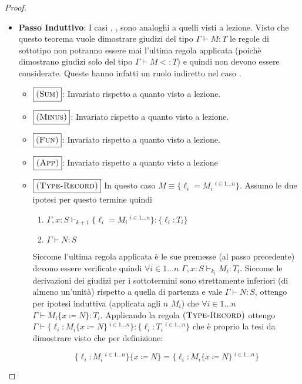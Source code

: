 \begin{proof}
\begin{itemize}
\begin{itemize}
		\item \textbf{Passo Induttivo}:  
		I casi , ,  sono analoghi a quelli visti a lezione. Visto che questo teorema
		vuole dimostrare giudizi del tipo $\Gamma \vdash M : T$ le regole di sottotipo non potranno essere mai l'ultima regola 
		applicata (poich\`e dimostrano giudizi solo del tipo $\Gamma \vdash M <: T$) e quindi non devono essere considerate. Queste hanno infatti un ruolo
		indiretto nel caso .
		\begin{itemize}
			\item $\boxed{\textsc{(Sum)}}$: Invariato rispetto a quanto visto a lezione.
			\item $\boxed{\textsc{(Minus)}}$: Invariato rispetto a quanto visto a lezione.
			\item $\boxed{\textsc{(Fun)}}$: Invariato rispetto a quanto visto a lezione.
			\item $\boxed{\textsc{(App)}}$: Invariato rispetto a quanto visto a lezione
			\item $\boxed{\textsc{(Type-Record)}}$
			In questo caso $M \equiv \{\ell_i = M_i\ ^{i \in 1 \dots n} \}$. Assumo le due ipotesi per questo termine
			quindi 
			\begin{enumerate}
				\item $\Gamma, x : S \vdash_{k+1} \{\ell_i = M_i\ ^{i \in 1 \dots n}\} : \{\ell_i : T_i\}$
				\item $\Gamma \vdash N : S$
			\end{enumerate}
			Siccome l'ultima regola applicata \`e  le sue premesse (al passo precedente) devono essere verificate quindi
			$\forall i \in 1 \dots n$ $ \Gamma, x : S \vdash_{k_i} M_i : T_i$. 
			Siccome le derivazioni dei giudizi per i sottotermini sono strettamente inferiori (di almeno un'unit\`a) rispetto
			a quella di partenza e vale $\Gamma \vdash N : S$, ottengo per ipotesi induttiva (applicata agli $n$ $M_i$) che
			$\forall i \in 1 \dots n$ $\Gamma \vdash M_i \{x \coloneqq N\} : T_i$.
			Applicando la regola $\textsc{(Type-Record)}$ ottengo
			$\Gamma \vdash \{\ell_i : M_i\{x \coloneqq N\}\ ^{i \in 1 \dots n} \} : \{\ell_i : T_i\ ^{i \in 1 \dots n}\}$ che \`e proprio la tesi da dimostrare visto che per definizione:
			
			$$
			\{\ell_i : M_i\ ^{i \in 1 \dots n}\}\{x \coloneqq N \} = \{\ell_i : M_i\{x \coloneqq N \}\ ^{i \in 1 \dots n}\}
			$$
			

\end{itemize}
\end{itemize}
\end{itemize}
\end{proof}
